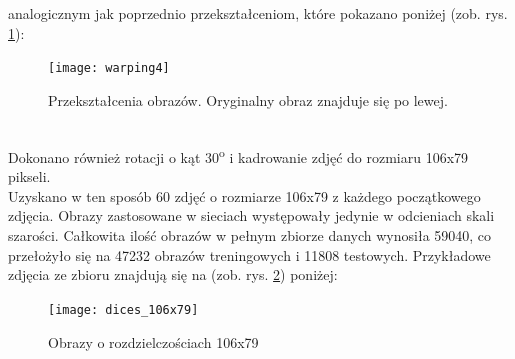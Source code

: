 analogicznym jak poprzednio przekształceniom, które pokazano poniżej (zob. rys. \ref{fig:warping4}):
\begin{figure}[h!]
\centering
\texttt{[image: warping4]}
\caption{Przekształcenia obrazów. Oryginalny obraz znajduje się po lewej.}
\label{fig:warping4}
\end{figure}\\
Dokonano również rotacji o kąt 30\textsuperscript{o} i kadrowanie zdjęć do rozmiaru 106x79 pikseli.\\
Uzyskano w ten sposób 60 zdjęć o rozmiarze 106x79 z każdego początkowego zdjęcia.
Obrazy zastosowane w sieciach występowały jedynie w odcieniach skali szarości.
Całkowita ilość obrazów w pełnym zbiorze danych wynosiła 59040, co przełożyło się
na 47232 obrazów treningowych i 11808 testowych. Przykładowe zdjęcia ze zbioru znajdują
się na (zob. rys. \ref{fig:rects}) poniżej:

\begin{figure}[h!]
\centering
\texttt{[image: dices\_106x79]}
\caption{Obrazy o rozdzielczościach 106x79}
\label{fig:rects}
\end{figure}
